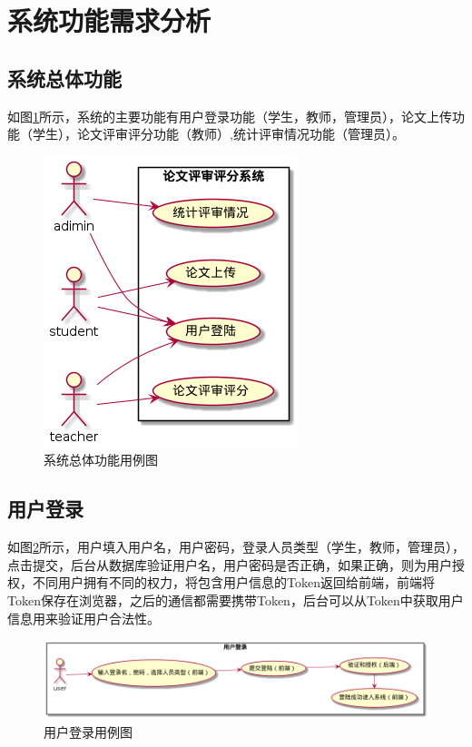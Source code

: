 \section{系统功能需求分析}

\subsection{系统总体功能}

如图\ref{system-usecase}所示，系统的主要功能有用户登录功能（学生，教师，管理员），论文上传功能（学生），论文评审评分功能（教师）,统计评审情况功能（管理员）。

\begin{figure}[htbp]
    \centering
    \includegraphics[scale = 0.6]{out/uml/用例图/系统总体功能用例图/系统总体功能用例图.png}
    \caption{\song\wuhao 系统总体功能用例图}
    \label{system-usecase}
\end{figure}

\subsection{用户登录}

如图\ref{login-usecase}所示，用户填入用户名，用户密码，登录人员类型（学生，教师，管理员），点击提交，后台从数据库验证用户名，用户密码是否正确，如果正确，则为用户授权，不同用户拥有不同的权力，将包含用户信息的Token返回给前端，前端将Token保存在浏览器，之后的通信都需要携带Token，后台可以从Token中获取用户信息用来验证用户合法性。

\begin{figure}[htbp]
    \centering
    \includegraphics[scale = 0.45]{out/uml/用例图/1-用户登录用例图/1-用户登录用例图.png}
    \caption{\song\wuhao 用户登录用例图}
    \label{login-usecase}
\end{figure}

